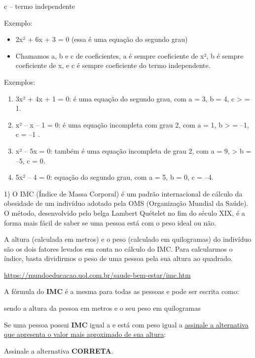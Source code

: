 \begin{escolha}
{{{\begin{escolha}
{c -- termo independente

Exemplo:

\begin{itemize}
\item
  2x² + 6x + 3 = 0 (essa é uma equação do segundo grau)
\item
  Chamamos a, b e c de coeficientes, a é sempre coeficiente de x², b é
  sempre coeficiente de x, e c é sempre coeficiente do termo
  independente.
\end{itemize}

Exemplos:

\begin{enumerate}
\def\labelenumi{\alph{enumi}.}
\item
  3x² + 4x + 1 = 0: é uma equação do segundo grau, com a = 3, b = 4, c
  \textgreater{} = 1.
\item
  x² -- x -- 1 = 0: é uma equação incompleta com grau 2, com a = 1, b
  \textgreater{} = --1, c = --1 .
\item
  x² -- 5x = 0: também é uma equação incompleta de grau 2, com a = 9,
  \textgreater{} b = --5, c = 0.
\item
  5x² -- 4 = 0: equação do segundo grau, com a = 5, b = 0, c = --4.
\end{enumerate}


1) O IMC (Índice de Massa Corporal) é um padrão internacional de cálculo
da obesidade de um indivíduo adotado pela OMS (Organização Mundial da
Saúde). O método, desenvolvido pelo belga Lambert Quételet no fim do
século XIX, é a forma mais fácil de saber se uma pessoa está com o peso
ideal ou não.

A altura (calculada em metros) e o peso (calculado em quilogramas) do
indivíduo são os dois fatores levados em conta no cálculo do IMC. Para
calcularmos o índice, basta dividirmos o peso de uma pessoa pela sua
altura ao quadrado.

\url{https://mundoeducacao.uol.com.br/saude-bem-estar/imc.htm}

A fórmula do \textbf{IMC} é a mesma para todas as pessoas e pode ser
escrita como:

sendo a altura da pessoa em metros e o seu peso em quilogramas

Se uma pessoa possui \textbf{IMC} igual a e está com peso igual a
\ul{assinale a alternativa que apresenta o valor mais aproximado de sua
altura}:

Assinale a alternativa \textbf{CORRETA}.

}
\end{escolha}}}}
\end{escolha}
